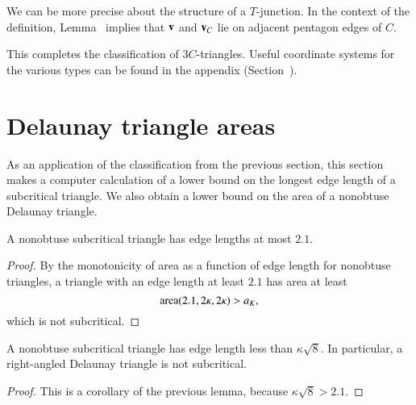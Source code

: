 We can be more precise about the structure of a $T$-junction.  In the
context of the definition, Lemma~ implies that ${\mathbf v}$
and ${\mathbf v}_C$ lie on adjacent pentagon edges of $C$.

This completes the classification of $3C$-triangles.  Useful
coordinate systems for the various types can be found in the appendix
(Section~).

\section{Delaunay triangle areas}

As an application of the classification from the previous section,
this section makes a computer calculation of a lower bound on the
longest edge length of a subcritical triangle.  We also obtain a lower
bound on the area of a nonobtuse Delaunay triangle.



\begin{lemma} A nonobtuse subcritical triangle has edge lengths
  at most $2.1$.
\end{lemma}

\begin{proof} By the monotonicity of area as a function of edge length
  for nonobtuse triangles, a triangle with an edge length at least
  $2.1$ has area at least
\[
{\operatorname{area}}(2.1,2\kappa,2\kappa) > a_K,
\] %
which is not subcritical.
\end{proof}

\begin{lemma} 
  A nonobtuse subcritical triangle has edge length less than
  $\kappa\sqrt8$.  In particular, a right-angled Delaunay triangle is
  not subcritical.
\end{lemma}

\begin{proof}  
This is a corollary of the previous lemma, because $\kappa\sqrt8 >
2.1$.
%
\end{proof}


